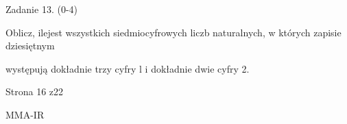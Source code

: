 \documentclass[a4paper,12pt]{article}
\begin{document}
Zadanie 13. (0-4)

Oblicz, ilejest wszystkich siedmiocyfrowych liczb naturalnych, w których zapisie dziesiętnym

występują dokładnie trzy cyfry l i dokładnie dwie cyfry 2.

Strona 16 z22

MMA-IR
\end{document}
